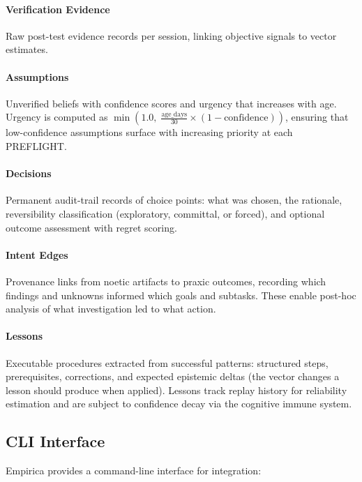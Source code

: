 \paragraph{Verification Evidence} Raw post-test evidence records per session, linking objective signals to vector estimates.

\paragraph{Assumptions} Unverified beliefs with confidence scores and urgency that increases with age. Urgency is computed as $\min(1.0,\; \frac{\text{age\_days}}{30} \times (1 - \text{confidence}))$, ensuring that low-confidence assumptions surface with increasing priority at each PREFLIGHT.

\paragraph{Decisions} Permanent audit-trail records of choice points: what was chosen, the rationale, reversibility classification (exploratory, committal, or forced), and optional outcome assessment with regret scoring.

\paragraph{Intent Edges} Provenance links from noetic artifacts to praxic outcomes, recording which findings and unknowns informed which goals and subtasks. These enable post-hoc analysis of what investigation led to what action.

\paragraph{Lessons} Executable procedures extracted from successful patterns: structured steps, prerequisites, corrections, and expected epistemic deltas (the vector changes a lesson should produce when applied). Lessons track replay history for reliability estimation and are subject to confidence decay via the cognitive immune system.

\subsection{CLI Interface}

Empirica provides a command-line interface for integration:

